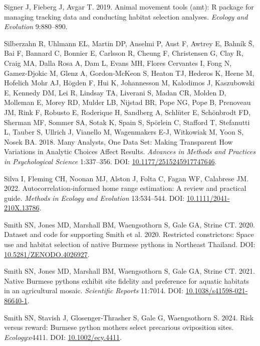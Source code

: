 \documentclass[10pt,a4paper]{article}
\newlength{\cslhangindent}
\newenvironment{CSLReferences}[2] %
 {\begin{list}{}{%
  \setlength{\itemindent}{0pt}
  \setlength{\leftmargin}{0pt}
  \setlength{\parsep}{0pt}
  \ifodd #1
   \setlength{\leftmargin}{\cslhangindent}
   \setlength{\itemindent}{-1\cslhangindent}
  \fi
  \setlength{\itemsep}{#2\baselineskip}}}
 {\end{list}}
\begin{document}
\begin{CSLReferences}{1}{0}
Signer J, Fieberg J, Avgar T. 2019. Animal movement tools (amt): R package for managing tracking data and conducting habitat selection analyses. \emph{Ecology and Evolution} 9:880--890.

Silberzahn R, Uhlmann EL, Martin DP, Anselmi P, Aust F, Awtrey E, Bahník Š, Bai F, Bannard C, Bonnier E, Carlsson R, Cheung F, Christensen G, Clay R, Craig MA, Dalla Rosa A, Dam L, Evans MH, Flores Cervantes I, Fong N, Gamez-Djokic M, Glenz A, Gordon-McKeon S, Heaton TJ, Hederos K, Heene M, Hofelich Mohr AJ, Högden F, Hui K, Johannesson M, Kalodimos J, Kaszubowski E, Kennedy DM, Lei R, Lindsay TA, Liverani S, Madan CR, Molden D, Molleman E, Morey RD, Mulder LB, Nijstad BR, Pope NG, Pope B, Prenoveau JM, Rink F, Robusto E, Roderique H, Sandberg A, Schlüter E, Schönbrodt FD, Sherman MF, Sommer SA, Sotak K, Spain S, Spörlein C, Stafford T, Stefanutti L, Tauber S, Ullrich J, Vianello M, Wagenmakers E-J, Witkowiak M, Yoon S, Nosek BA. 2018. Many {Analysts}, {One} {Data} {Set}: {Making} {Transparent} {How} {Variations} in {Analytic} {Choices} {Affect} {Results}. \emph{Advances in Methods and Practices in Psychological Science} 1:337--356. DOI: \href{https://doi.org/10.1177/2515245917747646}{10.1177/2515245917747646}.

Silva I, Fleming CH, Noonan MJ, Alston J, Folta C, Fagan WF, Calabrese JM. 2022. Autocorrelation‐informed home range estimation: {A} review and practical guide. \emph{Methods in Ecology and Evolution} 13:534--544. DOI: \href{https://doi.org/10.1111/2041-210X.13786}{10.1111/2041-210X.13786}.

Smith SN, Jones MD, Marshall BM, Waengsothorn S, Gale GA, Strine CT. 2020. Dataset and code for supporting {Smith} et al. 2020. {Restricted} constrictors: {Space} use and habitat selection of native {Burmese} pythons in {Northeast} {Thailand}. DOI: \href{https://doi.org/10.5281/ZENODO.4026927}{10.5281/ZENODO.4026927}.

Smith SN, Jones MD, Marshall BM, Waengsothorn S, Gale GA, Strine CT. 2021. Native {Burmese} pythons exhibit site fidelity and preference for aquatic habitats in an agricultural mosaic. \emph{Scientific Reports} 11:7014. DOI: \href{https://doi.org/10.1038/s41598-021-86640-1}{10.1038/s41598-021-86640-1}.

Smith SN, Stavish J, Glosenger‐Thrasher S, Gale G, Waengsothorn S. 2024. Risk versus reward: {Burmese} python mothers select precarious oviposition sites. \emph{Ecology}:e4411. DOI: \href{https://doi.org/10.1002/ecy.4411}{10.1002/ecy.4411}.


\end{CSLReferences}
\end{document}
